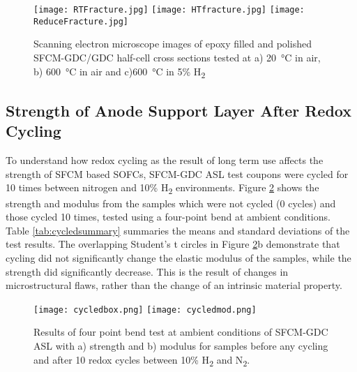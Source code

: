         \begin{figure}
          \texttt{[image: RTFracture.jpg]}
          \texttt{[image: HTfracture.jpg]}
          \texttt{[image: ReduceFracture.jpg]}
          \caption{Scanning electron microscope images of epoxy filled and polished SFCM-GDC/GDC half-cell cross sections tested at a) \SI{20}{\celsius} in air, b) \SI{600}{\celsius} in air and c)\SI{600}{\celsius} in 5\% H\textsubscript{2}}
          \label{fig:InSituSEM}
        \end{figure}

    \subsection{Strength of Anode Support Layer After Redox Cycling}
        To understand how redox cycling as the result of long term use affects the strength of SFCM based SOFCs, SFCM-GDC ASL test coupons were cycled for 10 times between nitrogen and 10\% H\textsubscript{2} environments.
        Figure \ref{fig:cycledbox} shows the strength and modulus from the samples which were not cycled (0 cycles) and those cycled 10 times, tested using a four-point bend at ambient conditions.
        Table \ref{tab:cycledsummary} summaries the means and standard deviations of the test results.
        The overlapping Student's t circles in Figure \ref{fig:cycledbox}b demonstrate that cycling did not significantly change the elastic modulus of the samples, while the strength did significantly decrease.
        This is the result of changes in microstructural flaws, rather than the change of an intrinsic material property.

        \begin{figure}
          \texttt{[image: cycledbox.png]}
          \texttt{[image: cycledmod.png]}
          \caption{Results of four point bend test at ambient conditions of SFCM-GDC ASL with a) strength and b) modulus for samples before any cycling and after 10 redox cycles between 10\% H\textsubscript{2} and N\textsubscript{2}.}
          \label{fig:cycledbox}
        \end{figure}

